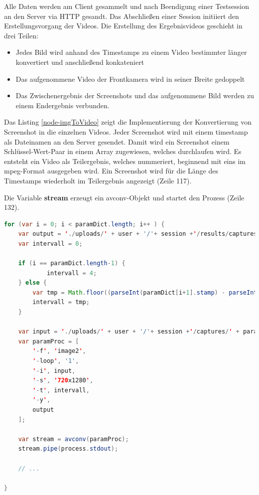 Alle Daten werden am Client gesammelt und nach Beendigung einer Testsession an den Server via HTTP gesandt. Das Abschließen einer Session initiiert den Erstellungsvorgang der Videos. Die Erstellung des Ergebnisvideos geschieht in drei Teilen: 

\begin{itemize}
	\item{Jedes Bild wird anhand des Timestamps zu einem Video bestimmter länger konvertiert und anschließend konkateniert}
	\item{Das aufgenommene Video der Frontkamera wird in seiner Breite gedoppelt}
	\item{Das Zwischenergebnis der Screenshots und das aufgenommene Bild werden zu einem Endergebnis verbunden. }
\end{itemize}

Das Listing \ref{node-imgToVideo} zeigt die Implementierung der Konvertierung von Screenshot in die einzelnen Videos. Jeder Screenshot wird mit einem timestamp als Dateinamen an den Server gesendet. Damit wird ein Screenshot einem Schlüssel-Wert-Paar in einem Array zugewiesen, welches durchlaufen wird. Es entsteht ein Video als Teilergebnis, welches nummeriert, beginnend mit eins im mpeg-Format ausgegeben wird. Ein Screenshot wird für die Länge des Timestamps wiederholt im Teilergebnis angezeigt (Zeile 117).

Die Variable \textbf{stream} erzeugt ein avconv-Objekt und startet den Prozess (Zeile 132). 

\begin{lstlisting}[label=node-imgToVideo,language=Java, caption=Erstellung der Videos aus Screenshots, firstnumber=110]
for (var i = 0; i < paramDict.length; i++ ) {
	var output = './uploads/' + user + '/'+ session +'/results/captures/'+ (i+1)+'.mpg';
	var intervall = 0;
    
    if (i == paramDict.length-1) {
    		intervall = 4;
	} else {
		var tmp = Math.floor((parseInt(paramDict[i+1].stamp) - parseInt(paramDict[i].stamp)) / 1000);    
        intervall = tmp;
	}
	
	var input = './uploads/' + user + '/'+ session +'/captures/' + paramDict[i].filename;
	var paramProc = [
		'-f', 'image2',
		'-loop', '1',
		'-i', input,
		'-s', '720x1280',
		'-t', intervall,
		'-y',
		output
	];

	var stream = avconv(paramProc);
	stream.pipe(process.stdout);
	
	// ...
	
}
\end{lstlisting}

